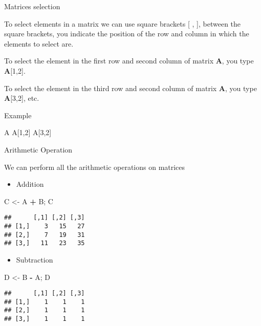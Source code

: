 \documentclass[ignorenonframetext,]{beamer}
\newenvironment{Shaded}{\begin{snugshade}}{\end{snugshade}}
\newcommand{\DecValTok}[1]{\textcolor[rgb]{0.00,0.00,0.81}{#1}}
\newcommand{\StringTok}[1]{\textcolor[rgb]{0.31,0.60,0.02}{#1}}
\newcommand{\OperatorTok}[1]{\textcolor[rgb]{0.81,0.36,0.00}{\textbf{#1}}}
\newcommand{\NormalTok}[1]{#1}
\providecommand{\tightlist}{%
  \setlength{\itemsep}{0pt}\setlength{\parskip}{0pt}}
\begin{document}
\begin{frame}[fragile]{Matrices selection}

To select elements in a matrix we can use square brackets {[} , {]},
between the square brackets, you indicate the position of the row and
column in which the elements to select are.

To select the element in the first row and second column of matrix
\textbf{A}, you type \textbf{A}{[}1,2{]}.

To select the element in the third row and second column of matrix
\textbf{A}, you type \textbf{A}{[}3,2{]}, etc.

\begin{block}{Example}

\begin{Shaded}
\begin{Highlighting}[]
\NormalTok{A}
\NormalTok{A[}\DecValTok{1}\NormalTok{,}\DecValTok{2}\NormalTok{]}
\NormalTok{A[}\DecValTok{3}\NormalTok{,}\DecValTok{2}\NormalTok{]}
\end{Highlighting}
\end{Shaded}

\end{block}

\end{frame}

\begin{frame}[fragile]{Arithmetic Operation}

We can perform all the arithmetic operations on matrices

\begin{itemize}
\tightlist
\item
  Addition
\end{itemize}

\begin{Shaded}
\begin{Highlighting}[]
\NormalTok{C <-}\StringTok{ }\NormalTok{A }\OperatorTok{+}\StringTok{ }\NormalTok{B; C}
\end{Highlighting}
\end{Shaded}

\begin{verbatim}
##      [,1] [,2] [,3]
## [1,]    3   15   27
## [2,]    7   19   31
## [3,]   11   23   35
\end{verbatim}

\begin{itemize}
\tightlist
\item
  Subtraction
\end{itemize}

\begin{Shaded}
\begin{Highlighting}[]
\NormalTok{D <-}\StringTok{ }\NormalTok{B }\OperatorTok{-}\StringTok{ }\NormalTok{A; D}
\end{Highlighting}
\end{Shaded}

\begin{verbatim}
##      [,1] [,2] [,3]
## [1,]    1    1    1
## [2,]    1    1    1
## [3,]    1    1    1
\end{verbatim}

\end{frame}
\end{document}

